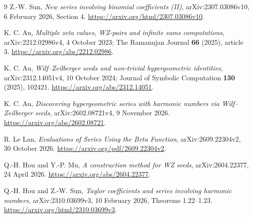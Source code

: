 \documentclass[11pt,a4paper]{article}
\theoremstyle{remark}\newtheorem{remark}[theorem]{Remark}
\numberwithin{equation}{section}
\begin{document}
\begin{thebibliography}{9}
Z.-W. Sun, \emph{New series involving binomial coefficients (II)},
arXiv:2307.03086v10, 6 February 2026, Section 4.
\url{https://arxiv.org/html/2307.03086v10}.

K. C. Au, \emph{Multiple zeta values, WZ-pairs and infinite sums computations},
arXiv:2212.02986v4, 4 October 2023;
The Ramanujan Journal \textbf{66} (2025), article 3.
\url{https://arxiv.org/abs/2212.02986}.

K. C. Au, \emph{Wilf--Zeilberger seeds and non-trivial hypergeometric identities},
arXiv:2312.14051v4, 10 October 2024;
Journal of Symbolic Computation \textbf{130} (2025), 102421.
\url{https://arxiv.org/abs/2312.14051}.

K. C. Au, \emph{Discovering hypergeometric series with harmonic numbers
via Wilf--Zeilberger seeds}, arXiv:2602.08721v4, 9 November 2026.
\url{https://arxiv.org/abs/2602.08721}.

R. Le Lan, \emph{Evaluations of Series Using the Beta Function},
arXiv:2609.22304v2, 30 October 2026.
\url{https://arxiv.org/pdf/2609.22304v2}.

Q.-H. Hou and Y.-P. Mu, \emph{A construction method for WZ seeds},
arXiv:2604.22377, 24 April 2026.
\url{https://arxiv.org/abs/2604.22377}.

Q.-H. Hou and Z.-W. Sun, \emph{Taylor coefficients and series involving
harmonic numbers}, arXiv:2310.03699v3, 10 February 2026,
Theorems 1.22--1.23.
\url{https://arxiv.org/html/2310.03699v3}.
\end{thebibliography}
\end{document}
